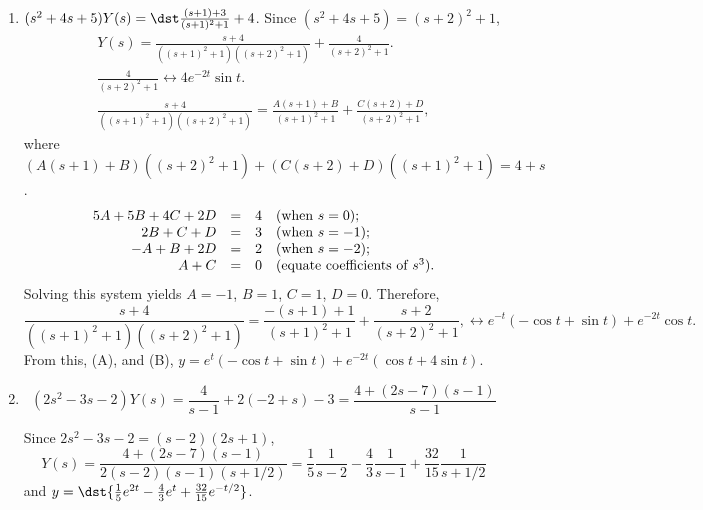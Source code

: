 \documentclass[openany]{book}
\newenvironment{sectionSolutions}{
 \begin{enumerate}[item-label={\thesection.\arabic{enumi}.}]
}{
 \end{enumerate}
}
\begin{document}
\begin{sectionSolutions}
\item
$(s^2+4s+5)Y(s)=\dst\frac{(s+1)+3}{ (s+1)^2+1}+4$.
Since $(s^2+4s+5)=(s+2)^2+1$,
\begin{gather*}
Y(s)=\frac{s+4}{ ((s+1)^2+1)((s+2)^2+1)}+\frac{4}{ (s+2)^2+1}.
\tag{A}\\
\frac{4}{ (s+2)^2+1}
\leftrightarrow 4e^{-2t}\sin t.
\tag{B}\\
\frac{s+4}{ ((s+1)^2+1)((s+2)^2+1)}=\frac{A(s+1)+B}{
(s+1)^2+1}+\frac{C(s+2)+D}{ (s+2)^2+1},
\end{gather*}
where
$\left(A(s+1)+B\right)\left((s+2)^2+1\right)+
\left(C(s+2)+D\right)\left((s+1)^2+1\right)=4+s$.
\[
\begin{array}{rc ll}
5A+5B+4C+2D&=&4&(\text{when }s=0);\\
2B+C+D&=&3&(\text{when }s=-1);\\
-A+B+2D&=&2&(\text{when }s=-2);\\
A+C&=&0&(\text{equate coefficients of }s^3).\\
\end{array}
\]
Solving this system yields $A=-1$, $B=1$, $C=1$, $D=0$. Therefore,
\[
\frac{s+4}{ ((s+1)^2+1)((s+2)^2+1)}=\frac{-(s+1)+1}{
(s+1)^2+1}+\frac{s+2}{ (s+2)^2+1},
\leftrightarrow e^{-t}(-\cos t+\sin t)+e^{-2t}\cos t.
\]
From this, (A), and (B),
$y=e^t(-\cos t+\sin t)+e^{-2t}(\cos t+4\sin t)$.



\item
\[
(2s^2-3s-2)Y(s)=\frac{4}{ s-1}+2(-2+s)-3=\frac{4+(2s-7)(s-1)}{ s-1}
\]

Since $2s^2-3s-2=(s-2)(2s+1)$,
\[
Y(s)=\frac{4+(2s-7)(s-1)}{2(s-2)(s-1)(s+1/2)}=
\frac{1}{5}\frac{1}{ s-2}-\frac{4}{3}\frac{1}{ s-1}+\frac{32}{15}\frac{1}{ s+1/2}
\]
and
 $y=\dst{\frac{1}{5}e^{2t}-\frac{4}{3}e^t
+\frac{32}{15}e^{-t/2}}$.



\end{sectionSolutions}
\end{document}

